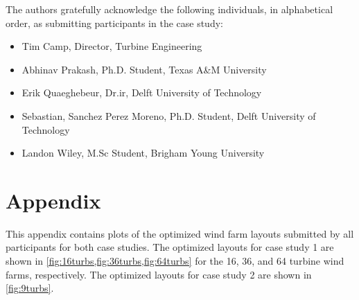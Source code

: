 \documentclass[conf,hidelinks]{new-aiaa} %
\begin{document}
The authors gratefully acknowledge the following individuals, in alphabetical order, as submitting participants in the case study:
\begin{itemize}
	\item Tim Camp, Director, Turbine Engineering
	\item Abhinav Prakash, Ph.D. Student, Texas A\&M University
	\item Erik Quaeghebeur, Dr.ir, Delft University of Technology
	\item Sebastian, Sanchez Perez Moreno, Ph.D. Student, Delft University of Technology
	\item Landon Wiley, M.Sc Student, Brigham Young University
\end{itemize}

\newpage
\section*{Appendix}
This appendix contains plots of the optimized wind farm layouts submitted by all participants for both case studies. The optimized layouts for case study 1 are shown in \cref{fig:16turbs,fig:36turbs,fig:64turbs} for the 16, 36, and 64 turbine wind farms, respectively. The optimized layouts for case study 2 are shown in \cref{fig:9turbs}.
\end{document}
